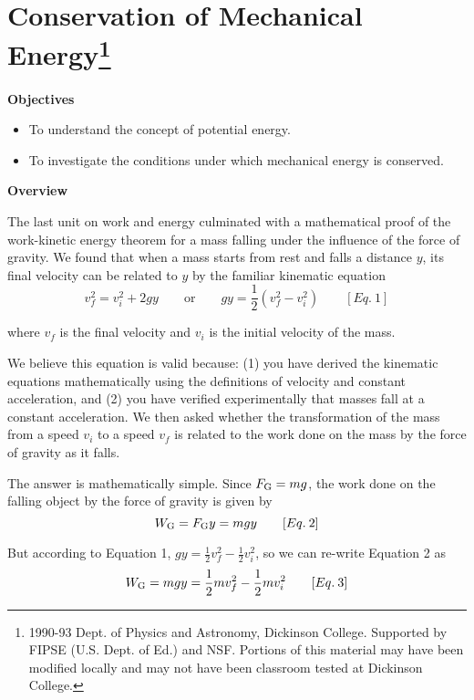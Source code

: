 
\section{Conservation of Mechanical Energy\footnote{
1990-93 Dept. of Physics and Astronomy, Dickinson College. Supported by FIPSE
(U.S. Dept. of Ed.) and NSF. Portions of this material may have been modified
locally and may not have been classroom tested at Dickinson College.
}}

\makelabheader %

\textbf{Objectives }

\begin{itemize}
\item To understand the concept of potential energy. 
\item To investigate the conditions under which mechanical energy is conserved.
\end{itemize}
\textbf{Overview }

The last unit on work and energy culminated with a mathematical proof of the
work-kinetic energy theorem for a mass falling under the influence of the 
force of gravity. We found that when a mass starts from rest and falls a 
distance $y$, its final velocity can be related to $y$ by the familiar 
kinematic equation
\[
v_{f}^{2}=v_{i}^{2}+2gy\qquad \mbox{or}
\qquad gy=\frac{1}{2}\left( v_{f}^{2}-v_{i}^{2}\right) \qquad [Eq.\: 1]\]


where \( v_{f} \) is the final velocity and \( v_{i} \) is the initial velocity
of the mass.

We believe this equation is valid because: (1) you have derived the kinematic
equations mathematically using the definitions of velocity and constant 
acceleration, and (2) you have verified experimentally that masses fall at a 
constant acceleration.
We then asked whether the transformation of the mass from a speed \( v_{i} \)
to a speed \( v_{f} \) is related to the work done on the mass by the force
of gravity as it falls.

The answer is mathematically simple. Since \( F_{\rm G}=mg \), the work done
on the falling object by the force of gravity is given by
\[
W_{\rm G}=F_{\rm G}y=mgy\qquad [Eq.\: 2]\]


But according to Equation 1, \(gy = \frac{1}{2} v_{f}^{2} - \frac{1}{2} 
v_{i}^{2} \),
so we can re-write Equation 2 as
\[
W_{\rm G}=mgy=\frac{1}{2}mv_{f}^{2}-\frac{1}{2}mv_{i}^{2}\qquad [Eq.\: 3]\]


